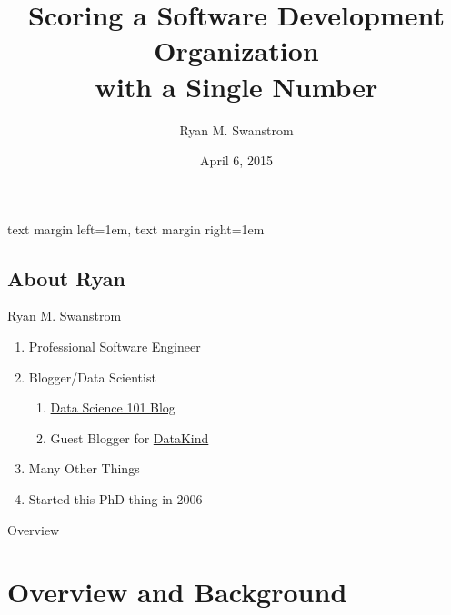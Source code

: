\usepackage[english] {babel}
\usepackage[T1]      {fontenc}
\usepackage{hyperref}

\usepackage{amsmath, amsfonts, graphicx}
\usepackage{tikz}
\usepackage{csquotes}


\setbeamersize
  {text margin left=1em, text margin right=1em}

\title
  [Scoring an SDO]
  {Scoring a Software Development Organization\\ with a Single Number}

\author
  {Ryan M. Swanstrom}

\date
  {April 6, 2015}




\maketitle

\subsection{About Ryan}
\begin{frame}
  {Ryan M. Swanstrom}
  
  \begin{enumerate}
    \item Professional Software Engineer
    \item Blogger/Data Scientist
    \begin{enumerate}
        \item \href{http://101.datascience.community}{Data Science 101 Blog}
        \item Guest Blogger for \href{http://www.datakind.org/blog/}{DataKind}
    \end{enumerate}
    \item Many Other Things
    \item Started this PhD thing in 2006
  \end{enumerate}
\end{frame}

\begin{frame}{Overview}

  \tableofcontents

\end{frame}

\section{Overview and Background}

